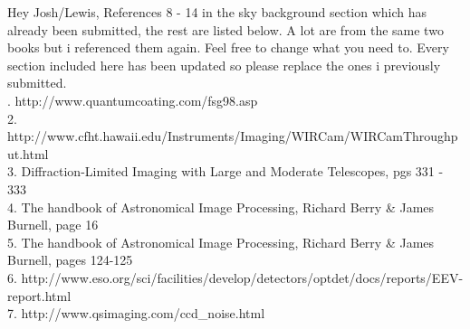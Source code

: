 \documentclass[pdf,color]{UoBnote}
\begin{document}
Hey Josh/Lewis, References 8 - 14 in the sky background section which has already been submitted, the rest are listed below. A lot are from the same two books but i referenced them again. Feel free to change what you need to. Every section included here has been updated so please replace the ones i previously submitted.\\
\newline
{}. http://www.quantumcoating.com/fsg98.asp 
\\
2. http://www.cfht.hawaii.edu/Instruments/Imaging/WIRCam/WIRCamThroughput.html
\\
3. Diffraction-Limited Imaging with Large and Moderate Telescopes, pgs 331 - 333
\\
4. The handbook of Astronomical Image Processing, Richard Berry \& James Burnell, page 16
\\
5. The handbook of Astronomical Image Processing, Richard Berry \& James Burnell, pages 124-125
\\
6. http://www.eso.org/sci/facilities/develop/detectors/optdet/docs/reports/EEV-report.html
\\
7.	http://www.qsimaging.com/ccd\_noise.html
\end{document}
